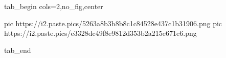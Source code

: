  
 
 
 
 


\ifcmt
  tab_begin cols=2,no_fig,center

     pic https://i2.paste.pics/5263a8b3b8b8c1c84528e437c1b31906.png
		 pic https://i2.paste.pics/e3328dc49f8e9812d353b2a215e671e6.png

  tab_end
\fi
